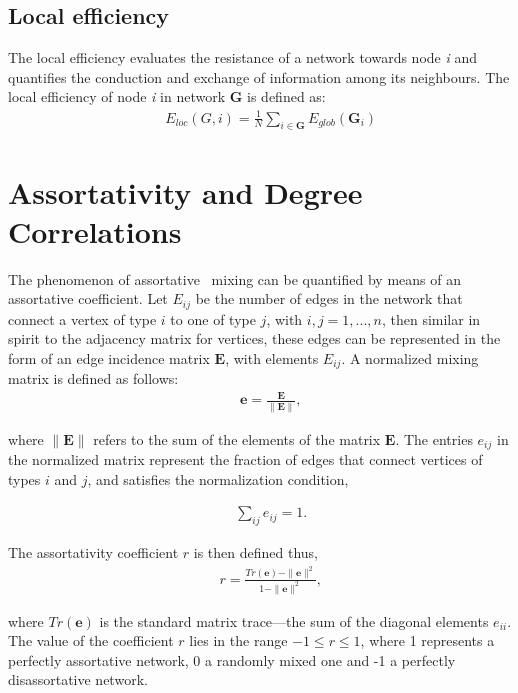 \subsection{Local efficiency}
The local efficiency evaluates the resistance of a network towards node \textit{i} and quantifies the conduction and exchange of information among its neighbours. The local efficiency of node \textit{i} in network \textbf{G} is defined as:
\begin{eqnarray}
&&E_{loc}(G, i)=\frac{1}{N} \sum_{i \in \textbf{G}} E_{glob}(\textbf{G}_i)
\end{eqnarray}

\section{Assortativity and Degree Correlations}

The phenomenon of assortative~\cite{newman2002assortative} mixing can be quantified by means of an assortative
coefficient. Let $E_{ij}$ be the number of edges in the network that connect
a vertex of type $i$ to one of type $j$, with $i, j=1, . . . , n$, then similar in spirit to the
adjacency matrix for vertices, these edges can be represented in the form of an edge
incidence matrix $\mathbf{E}$, with elements $E_{ij}$. A normalized mixing matrix is defined as follows:
\begin{eqnarray}
&&\mathbf{e}=\frac{\mathbf{E}}{\|\mathbf{E}\|},
\end{eqnarray}

where $\|\mathbf{E}\|$ refers to the sum of the elements of the matrix $\mathbf{E}$. The entries $e_{ij}$ in the normalized matrix represent the fraction of edges that connect vertices of types $i$ and $j$, and satisfies the normalization condition,

\begin{eqnarray}
&&\sum_{ij}e_{ij}=1.
\end{eqnarray}

The assortativity coefficient $r$ is then defined thus,
\begin{eqnarray}
&&r=\frac{Tr(\mathbf{e})-\|\mathbf{e}\|^2}{1-\|\mathbf{e}\|^2},\label{con:degreecorr}
\end{eqnarray}

where $Tr(\mathbf{e})$ is the standard matrix trace—the sum of the diagonal elements $e_{ii}$. The value of the coefficient $r$ lies in the range $-1\leq{r}\leq{1}$, where 1 represents a perfectly assortative network, 0 a randomly mixed one and -1 a perfectly disassortative network.

